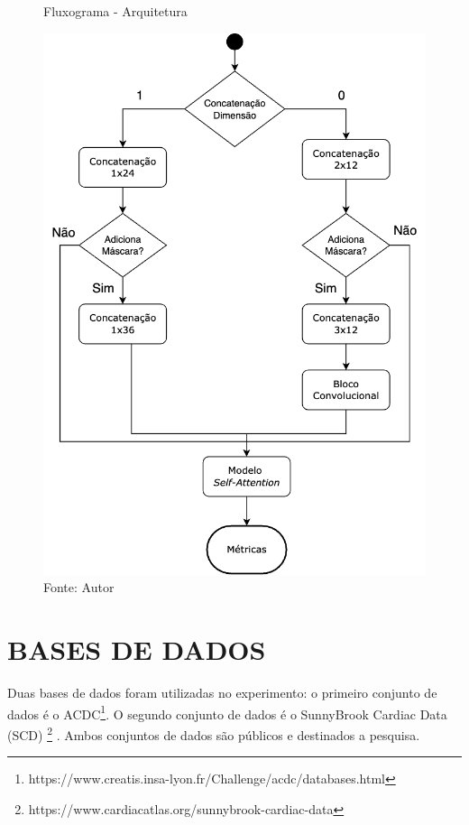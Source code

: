 \begin{figure}[H]
    \centering
    \caption{Fluxograma - Arquitetura}
    \includegraphics[scale=0.38]{figures/fig015-02.png}
    \caption*{Fonte: Autor}
    \label{fig:fig015-02}
\end{figure}

\section{BASES DE DADOS} 
\label{subsec:cap4_dataset}

Duas bases de dados foram utilizadas no experimento: o primeiro conjunto de dados é o \gls{ACDC}\footnote{https://www.creatis.insa-lyon.fr/Challenge/acdc/databases.html}. O segundo conjunto de dados é o SunnyBrook Cardiac Data (SCD) \footnote{https://www.cardiacatlas.org/sunnybrook-cardiac-data} \cite{radauEvaluationFrameworkAlgorithms2009}. Ambos conjuntos de dados são públicos e destinados a pesquisa.

